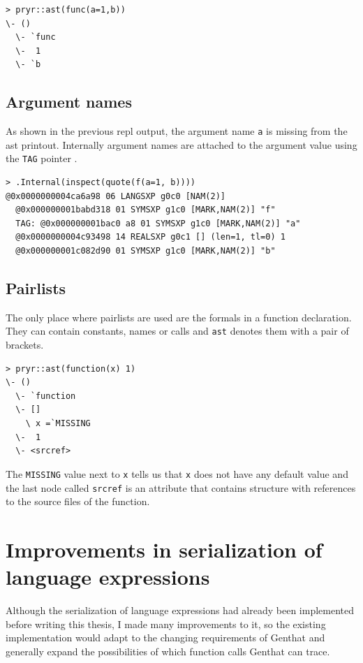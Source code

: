 \documentclass[thesis=B,english]{FITthesis}[2012/10/20]
\begin{document}
\begin{verbatim}
> pryr::ast(func(a=1,b))
\- ()
  \- `func
  \-  1
  \- `b
\end{verbatim}

\subsection{Argument names} \label{ssub:tags}
As shown in the previous repl output, the argument name \verb|a| is missing from the ast printout. Internally argument names are attached to the argument value using the \verb|TAG| pointer \cite{specs}.

\begin{verbatim}
> .Internal(inspect(quote(f(a=1, b))))
@0x0000000004ca6a98 06 LANGSXP g0c0 [NAM(2)]
  @0x000000001babd318 01 SYMSXP g1c0 [MARK,NAM(2)] "f"
  TAG: @0x000000001bac0 a8 01 SYMSXP g1c0 [MARK,NAM(2)] "a"
  @0x0000000004c93498 14 REALSXP g0c1 [] (len=1, tl=0) 1
  @0x000000001c082d90 01 SYMSXP g1c0 [MARK,NAM(2)] "b"
\end{verbatim}

\subsection{Pairlists}
The only place where pairlists are used are the formals in a function declaration. They can contain constants, names or calls and \verb|ast| denotes them with a pair of brackets.

\begin{verbatim}
> pryr::ast(function(x) 1)
\- ()
  \- `function
  \- []
    \ x =`MISSING
  \-  1
  \- <srcref>
\end{verbatim}

The \verb|MISSING| value next to \verb|x| tells us that \verb|x| does not have any default value and the last node called \verb|srcref| is an attribute that contains structure with references to the source files of the function.

\section{Improvements in serialization of language expressions}
Although the serialization of language expressions had already been implemented before writing this thesis, I made many improvements to it, so the existing implementation would adapt to the changing requirements of Genthat and generally expand the possibilities of which function calls Genthat can trace.
\end{document}
